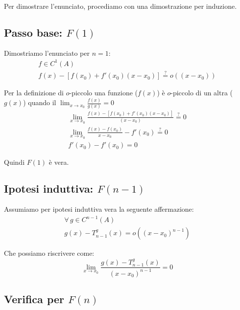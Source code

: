 \documentclass[../../analisi1]{subfiles}
\begin{document}
            Per dimostrare l'enunciato, procediamo con una dimostrazione per induzione.

            \medskip

            \subsection*{Passo base: \(F(1)\)}

                Dimostriamo l'enunciato per \(n = 1\):
                \begin{gather*}
                    f \in C^1(A)\\
                    f(x) - \left[ f(x_0) + f'(x_0)(x-x_0) \right] \stackrel{?}{=}  o ((x-x_0))
                \end{gather*}

                Per la definizione di \(o\)-piccolo una funzione (\(f(x)\)) è \(o\)-piccolo di un altra (\(g(x)\)) quando il \( \lim_{x \to x_0} \frac{f(x)}{g(x)} = 0\) 
                \begin{gather*}
                    \lim_{x \to x_0} \frac{f(x) - \left[ f(x_0) + f'(x_0)(x-x_0) \right]}{(x-x_0)} \stackrel{?}{=} 0\\
                    \lim_{x \to x_0} \frac{f(x) - f(x_0)}{x - x_0} - f'(x_0) \stackrel{?}{=} 0\\
                    f'(x_0) - f'(x_0) = 0
                \end{gather*}

                Quindi \(F(1)\) è vera. 

            \subsection*{Ipotesi induttiva: \(F(n-1)\)}

                Assumiamo per ipotesi induttiva vera la seguente affermazione:
                \begin{gather*}
                    \forall \, g \in C^{n-1} (A)\\
                    g(x) - T _{n - 1} ^ g (x) = o ((x-x_0)^{n-1})
                \end{gather*}
                
                Che possiamo riscrivere come:
                \[  \lim_{x \to x_0} \frac{g(x) - T _{n - 1} ^ g (x)}{(x-x_0)^{n-1}} = 0 \]

            \subsection*{Verifica per \(F(n)\)}
\end{document}
